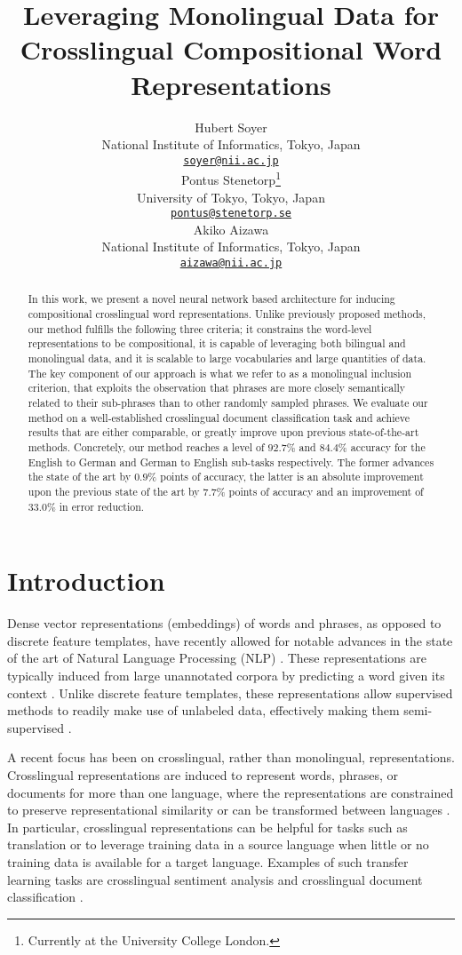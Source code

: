 \documentclass{article} \usepackage{iclr2015,times}
\title{
    Leveraging Monolingual Data
        for Crosslingual Compositional Word Representations
}
\author{
    Hubert Soyer \\
    National Institute of Informatics, Tokyo, Japan \\
    {\tt \href{mailto:soyer@nii.ac.jp}{soyer@nii.ac.jp}} \\
    \And
    Pontus Stenetorp\thanks{
        Currently at the University College London.
    } \\
    University of Tokyo, Tokyo, Japan \\
    {\tt \href{mailto:pontus@stenetorp.se}{pontus@stenetorp.se}} \\
    \And
    Akiko Aizawa \\
    National Institute of Informatics, Tokyo, Japan \\
    {\tt \href{mailto:aizawa@nii.ac.jp}{aizawa@nii.ac.jp}}
}
\begin{document}
\maketitle

\begin{abstract}
In this work, we present a novel neural network based architecture for
inducing compositional crosslingual word representations.
Unlike previously proposed methods, our method fulfills the following three
criteria; it constrains the word-level representations to be compositional,
it is capable of leveraging both bilingual and monolingual data, and it is
scalable to large vocabularies and large quantities of data.
The key component of our approach is what we refer to as a monolingual inclusion
criterion, that exploits the observation that phrases are more closely
semantically related to their sub-phrases than to other randomly sampled
phrases.
We evaluate our method on a well-established crosslingual document
classification task and achieve results that are either comparable, or greatly
improve upon previous state-of-the-art methods.
Concretely, our method reaches a level of $92.7\%$ and $84.4\%$ accuracy for
the English to German and German to English sub-tasks respectively.
The former advances the state of the art by $0.9\%$ points of accuracy,
the latter is an absolute improvement upon the previous state of the art
by $7.7\%$ points of accuracy and an improvement of $33.0\%$ in error reduction.
\end{abstract}

\section{Introduction}

Dense vector representations (embeddings) of words and phrases, as opposed to
discrete feature templates, have recently allowed for notable advances in the
state of the art of Natural Language Processing (NLP)
\citep{socher2013recursive,baroni2014dont}.
These representations are typically induced from large unannotated corpora by
predicting a word given its context \citep{collobert2008unified}.
Unlike discrete feature templates, these representations allow supervised
methods to readily make use of unlabeled data, effectively making
them semi-supervised \citep{turian2010word}.

A recent focus has been on crosslingual, rather than monolingual,
representations.
Crosslingual representations are induced to represent words, phrases,
or documents for more than one language, where the representations are
constrained to preserve representational similarity or can be transformed
between languages
\citep{klementiev2012inducing,mikolov2013mt,hermann2014multilingual}.
In particular, crosslingual representations can be helpful for tasks such as
translation or to leverage training data in a source language when little
or no training data is available for a target language.
Examples of such transfer learning tasks are crosslingual sentiment
analysis \citep{wan2009crosssentiment}
and crosslingual document classification \citep{klementiev2012inducing}.
\end{document}
